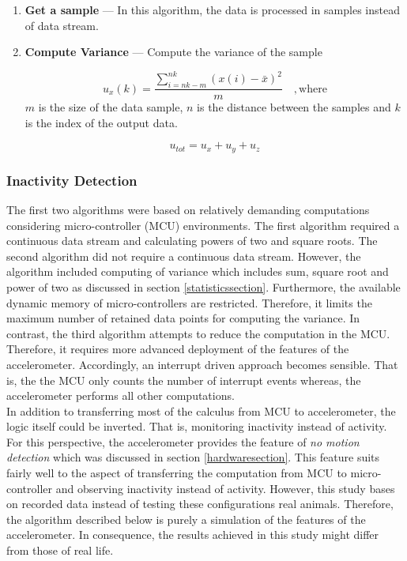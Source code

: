 \documentclass[english,12pt,a4paper,pdftex,elec,utf8]{aaltothesis}
\begin{document}
\begin{enumerate}

\item \textbf{Get a sample} --- In this algorithm, the data is processed in samples instead of data stream. 

\item \textbf{Compute Variance} --- Compute the variance of the sample

\begin{equation} \label{samplevariance}
u_x(k) = \frac{\sum \limits_{i=nk-m}^{nk} (x(i) - \bar{x})^2}{m} \mathrm{\hspace{1em}, where}
\end{equation}
$m$ is the size of the data sample, $n$ is the distance between the samples and $k$ is the index of the output data. 

\begin{equation}
u_{tot} = u_x + u_y + u_z
\end{equation}

\end{enumerate}


\subsubsection{Inactivity Detection} \label{inactivitydetectionsection}

The first two algorithms were based on relatively demanding computations considering micro-controller (MCU) environments. The first algorithm required a continuous data stream and calculating powers of two and square roots. The second algorithm did not require a continuous data stream. However, the algorithm included computing of variance which includes sum, square root and power of two as discussed in section \ref{statisticssection}. Furthermore, the available dynamic memory of micro-controllers are restricted. Therefore, it limits the maximum number of retained data points for computing the variance. In contrast, the third algorithm attempts to reduce the computation in the MCU. Therefore, it requires more advanced deployment of the features of the accelerometer. Accordingly, an interrupt driven approach becomes sensible. That is, the the MCU only counts the number of interrupt events whereas, the accelerometer performs all other computations. \\

In addition to transferring most of the calculus from MCU to accelerometer, the logic itself could be inverted. That is, monitoring inactivity instead of activity. For this perspective, the accelerometer provides the feature of \textit{no motion detection} which was discussed in section \ref{hardwaresection}. This feature suits fairly well to the aspect of transferring the computation from MCU to micro-controller and observing inactivity instead of activity. However, this study bases on recorded data instead of testing these configurations real animals. Therefore, the algorithm described below is purely a simulation of the features of the accelerometer. In consequence, the results achieved in this study might differ from those of real life. \\
\end{document}
